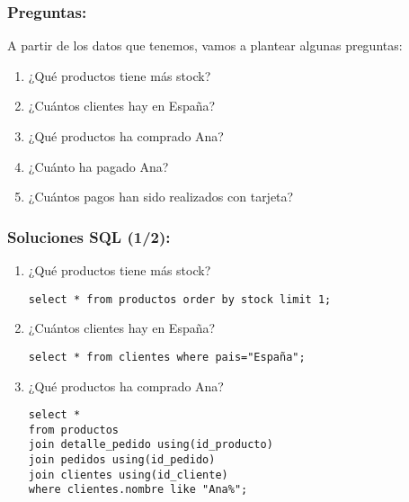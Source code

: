 \documentclass{beamer}
\begin{document}

\begin{frame}[fragile]
  \frametitle{Preguntas:}

  A partir de los datos que tenemos, vamos a plantear algunas preguntas:

  \begin{enumerate}
    \item ¿Qué productos tiene más stock?
    \item ¿Cuántos clientes hay en España?
    \item ¿Qué productos ha comprado Ana?
    \item ¿Cuánto ha pagado Ana?
    \item ¿Cuántos pagos han sido realizados con tarjeta?


  \end{enumerate}
\end{frame}




\begin{frame}[fragile]
  \frametitle{Soluciones SQL (1/2):}

  \begin{enumerate}
    \item ¿Qué productos tiene más stock?
    \begin{lstlisting}
select * from productos order by stock limit 1;
    \end{lstlisting}

    \item ¿Cuántos clientes hay en España?
    \begin{lstlisting}
select * from clientes where pais="España";
    \end{lstlisting}

    \item ¿Qué productos ha comprado Ana?
    \begin{lstlisting}
select *
from productos
join detalle_pedido using(id_producto)
join pedidos using(id_pedido)
join clientes using(id_cliente)
where clientes.nombre like "Ana%";
    \end{lstlisting}
  \end{enumerate}
\end{frame}
\end{document}
